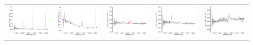 \begin{center}
\begin{longtable}{l l l l l }
    \includegraphics[width=0.2\linewidth, clip]{Figs/Figs-sdss/spec-3590-55201-0554-STRIPE82-0018-038274.pdf} & \includegraphics[width=0.2\linewidth, clip]{Figs/Figs-sdss/spec-3609-55201-0610-STRIPE82-0044-021486.pdf} & \includegraphics[width=0.2\linewidth, clip]{Figs/Figs-sdss/spec-3775-55207-0067-SPLUS-n03s19-045911.pdf} & \includegraphics[width=0.2\linewidth, clip]{Figs/Figs-sdss/spec-3776-55209-0054-SPLUS-n03s23-033092.pdf} & \includegraphics[width=0.2\linewidth, clip]{Figs/Figs-sdss/spec-3776-55209-0768-SPLUS-n02s22-016624.pdf} \\

\end{longtable}
\end{center}
